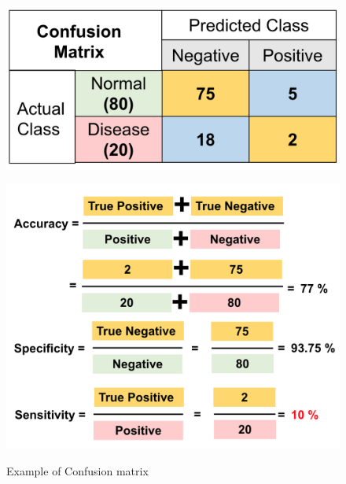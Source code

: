 \begin{figure}[H]
	\centering
	\begin{minipage}{0.6\columnwidth}
		\centering
		\includegraphics[clip, width=0.7\linewidth]{fig/chapter2/confusion_examples}
		\label{fig:confusion_table}
	\end{minipage}
	\begin{minipage}{0.8\columnwidth}
		\centering
		\includegraphics[clip, width=0.7\linewidth]{fig/chapter2/confusion_math}
		\label{fig:confusion_math}
	\end{minipage}
	\caption{Example of Confusion matrix}
	\label{fig:confusion_ex}
\end{figure}

